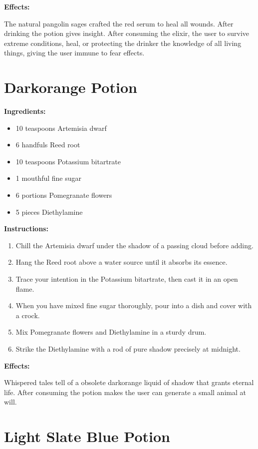 \documentclass{article}
\begin{document}
\textbf{Effects:}

The natural pangolin sages crafted the red serum to heal all wounds. After drinking the potion gives insight. After consuming the elixir, the user to survive extreme conditions, heal, or protecting the drinker the knowledge of all living things, giving the user immune to fear effects.

\newpage
\section*{Darkorange Potion}

\textbf{Ingredients:}

\begin{itemize}
  \item 10 teaspoons Artemisia dwarf
  \item 6 handfuls Reed root
  \item 10 teaspoons Potassium bitartrate
  \item 1 mouthful fine sugar
  \item 6 portions Pomegranate flowers
  \item 5 pieces Diethylamine
\end{itemize}

\textbf{Instructions:}

\begin{enumerate}
  \item Chill the Artemisia dwarf under the shadow of a passing cloud before adding.
  \item Hang the Reed root above a water source until it absorbs its essence.
  \item Trace your intention in the Potassium bitartrate, then cast it in an open flame.
  \item When you have mixed fine sugar thoroughly, pour into a dish and cover with a crock.
  \item Mix Pomegranate flowers and Diethylamine in a sturdy drum.
  \item Strike the Diethylamine with a rod of pure shadow precisely at midnight.
\end{enumerate}

\textbf{Effects:}

Whispered tales tell of a obsolete darkorange liquid of shadow that grants eternal life. After consuming the potion makes the user can generate a small animal at will.

\newpage
\section*{Light Slate Blue Potion}
\end{document}
